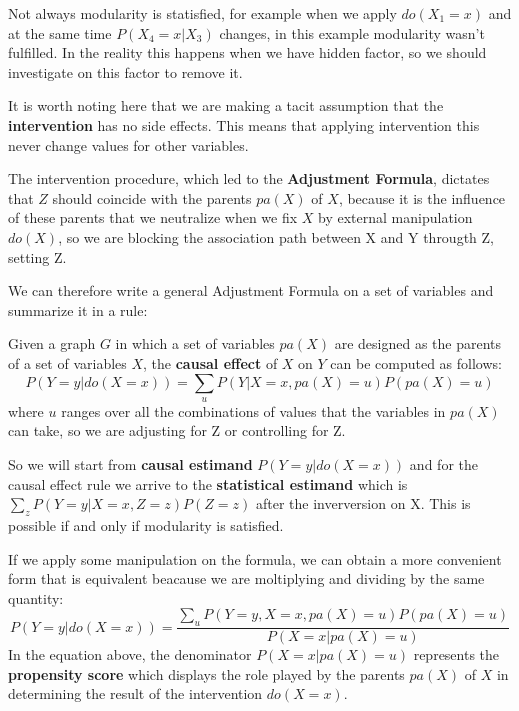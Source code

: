 Not always modularity is statisfied, for example when we apply $do(X_1=x)$ 
and at the same time $P(X_4=x|X_3)$ changes, in this example modularity wasn't
fulfilled. In the reality this happens when we have hidden factor, so we 
should investigate on this factor to remove it.

\begin{note}
      It is worth noting here that we are making a tacit assumption that
      the \textbf{intervention} has no side effects. This means that applying intervention 
      this never change values for other variables.
\end{note}

The intervention procedure, which led to the \textbf{Adjustment Formula},
dictates that $Z$ should coincide with the parents $pa(X)$ of $X$, because it is
the influence of these parents that we neutralize when we fix $X$ by external
manipulation $do(X)$, so we are blocking the association path between X and Y througth
Z, setting Z.

We can therefore write a general Adjustment Formula on a set of variables and summarize it in a rule:
\begin{definition}
      Given a graph $G$ in which a set of variables $pa(X)$ are designed as the
      parents of a set of variables $X$, the \textbf{causal effect} of $X$ on $Y$ can be computed
      as follows:
      \begin{equation}
            P(Y = y| do(X = x)) = \sum_{u} P(Y | X = x, pa(X) = u)P(pa(X) = u)
      \end{equation}
      where $u$ ranges over all the combinations of values that the variables in
      $pa(X)$ can take, so we are adjusting for Z or controlling for Z.
\end{definition}

So we will start from \textbf{causal estimand} $P(Y=y|do(X=x))$ and for the causal effect
rule we arrive to the \textbf{statistical estimand} which is  $\sum_z P(Y=y|X=x, Z=z) P(Z=z)$ after 
the inverversion on X. This is possible if and only if modularity is satisfied.

If we apply some manipulation on the formula, we can obtain a more convenient
form that is equivalent beacause we are moltiplying and dividing by the same quantity:
\begin{equation}
      P(Y = y| do(X = x)) = \frac{\sum_{u} P(Y = y, X = x, pa(X) = u)P(pa(X) = u)}{P(X = x | pa(X) = u)}
\end{equation}
In the equation above, the denominator $P(X = x | pa(X) = u)$ represents the \textbf{propensity score}
which displays the role played by the parents $pa(X)$ of $X$ in determining the
result of the intervention $do(X = x)$.

